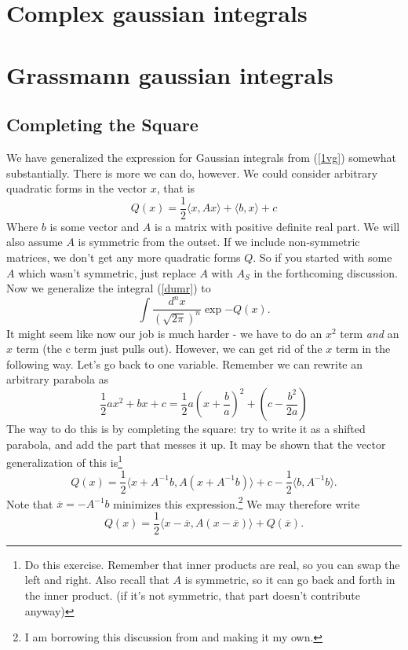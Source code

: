 \documentclass{book}
\begin{document}
\section{Complex gaussian integrals}

\section{Grassmann gaussian integrals}

\newpage
\subsection{Completing the Square}
We have generalized the expression for Gaussian integrals from (\ref{1vg}) somewhat substantially. There is more we can do, however. We could consider arbitrary quadratic forms in the vector $x$, that is
\begin{equation} \label{qform}
Q(x) = \frac{1}{2} \langle x, A x \rangle + \langle b, x \rangle + c
\end{equation}
Where $b$ is some vector and $A$ is a matrix with positive definite real part. We will also assume $A$ is symmetric from the outset. If we include non-symmetric matrices, we don't get any more quadratic forms $Q$. So if you started with some $A$ which wasn't symmetric, just replace $A$ with $A_S$ in the forthcoming discussion. Now we generalize the integral (\ref{dumr}) to
\begin{equation} \label{quadint}
\int \frac{d^n x}{(\sqrt{2\pi})^n} \exp{-Q(x)}.
\end{equation}
It might seem like now our job is much harder - we have to do an $x^2$ term \textit{and} an $x$ term (the c term just pulls out). However, we can get rid of the $x$ term in the following way. Let's go back to one variable. Remember we can rewrite an arbitrary parabola as
\begin{equation} \label{grade8}
\frac{1}{2} a x^2 + bx + c = \frac{1}{2} a\left( x + \frac{b}{a} \right)^2 + \left( c - \frac{b^2}{2a} \right)
\end{equation}
The way to do this is by completing the square: try to write it as a shifted parabola, and add the part that messes it up. It may be shown that the vector generalization of this is\footnote{Do this exercise. Remember that inner products are real, so you can swap the left and right. Also recall that $A$ is symmetric, so it can go back and forth in the inner product. (if it's not symmetric, that part doesn't contribute anyway)}
\[
Q(x) = \frac{1}{2} \langle x + A^{-1}b, A \left( x + A^{-1}b\right) \rangle + c - \frac{1}{2}\langle b, A^{-1} b \rangle.
\]
Note that $\overline{x} = -A^{-1} b$ minimizes this expression.\footnote{I am borrowing this discussion from \cite{Co1} and making it my own.} We may therefore write
\[
Q(x) = \frac{1}{2} \langle x - \overline{x}, A(x - \overline{x}) \rangle + Q(\overline{x}).
\]
\end{document}

